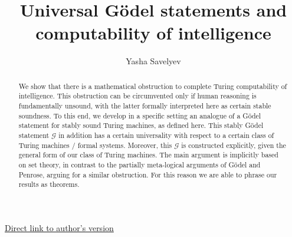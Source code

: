 \documentclass{amsart}  %
\numberwithin{equation}{section}
\theoremstyle{definition}
\theoremstyle{remark}
\begin{document}
\title {Universal G\"odel statements and computability of intelligence} 
\author{Yasha Savelyev} 
\href{http://yashamon.github.io/web2/papers/immitation.pdf} {Direct link to author's version}
\address{University of Colima, Department of Sciences, CUICBAS}
\begin{abstract}
 We show that there is a mathematical obstruction to complete Turing computability of intelligence.  This obstruction can be circumvented only if human reasoning is fundamentally unsound, with the latter formally interpreted here as certain stable soundness. To this end, we develop in a specific setting an analogue of a G\"odel statement for stably sound Turing machines, as defined here. This stably G\"odel statement $\mathcal{G}$ in addition has a certain universality with respect to a certain class of Turing machines / formal systems.   Moreover, this $\mathcal{G}$ is constructed explicitly, given the general form of our class of Turing machines. The main argument is implicitly based on set theory, in contrast to the partially meta-logical arguments of G\"odel and Penrose, arguing for a similar obstruction. For this reason we are able to phrase our results as theorems.
\end{abstract}
\maketitle
%
\end{document}
